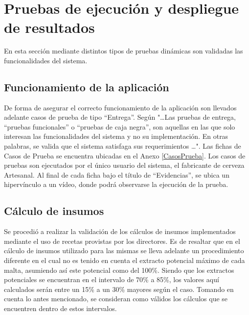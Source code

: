 \section{Pruebas de ejecución y despliegue de resultados}

\par En esta sección mediante distintos tipos de pruebas dinámicas son validadas las funcionalidades del sistema.

\subsection{Funcionamiento de la aplicación}
De forma de asegurar el correcto funcionamiento de la aplicación son llevados adelante casos de prueba de tipo ``Entrega''. Según \cite{Som05} "\ldots Las pruebas de entrega, “pruebas funcionales” o “pruebas de caja negra”, son aquellas en las que solo interesan las funcionalidades del sistema y no su implementación. En otras palabras, se valida que el sistema satisfaga sus requerimientos \ldots".
Las fichas de Casos de Prueba se encuentra ubicadas en el Anexo \ref{CasosPrueba}. Los casos de pruebas son ejecutados por el único usuario del sistema, el fabricante de cerveza Artesanal. Al final de cada ficha bajo el título de ``Evidencias'', se ubica un hipervínculo a un vídeo, donde podrá observarse la ejecución de la prueba.

\subsection{Cálculo de insumos}
\par Se procedió a realizar la validación de los cálculos de insumos implementados mediante el uso de recetas provistas por los directores. Es de resaltar que en el cálculo de insumos utilizado para las mismas se lleva adelante un procedimiento diferente en el cual no es tenido en cuenta el extracto potencial máximo de cada malta, asumiendo así este potencial como del 100\%. Siendo que los extractos potenciales se encuentran en el intervalo de 70\% a 85\%, los valores aquí calculados serán entre un 15\% a un 30\% mayores según el caso. Tomando en cuenta lo antes mencionado, se consideran como válidos los cálculos que se encuentren dentro de estos intervalos.


